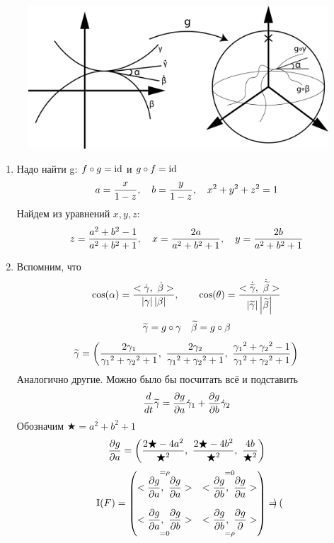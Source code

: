 \documentclass[12pt, fleqn]{article}
\begin{document}
\begin{sol}
  \begin{figure}[H]
      \includegraphics[scale=0.3]{pics/7_1.png}
      \centering
  \end{figure}
  \begin{enumerate}
    \item Надо найти g: $f \circ g = \mathop{\rm id}\nolimits$ и $g \circ f = \mathop{\rm id}\nolimits$
    \[a = \dfrac{x}{1-z},\quad b = \dfrac{y}{1-z},\quad x^2 + y^2 + z^2 = 1\]
    Найдем из уравнений $x,y,z$:
    \[z = \dfrac{a^2 + b^2 - 1}{a^2 + b^2 + 1},\quad
    x = \dfrac{2a}{a^2 + b^2 + 1},\quad
    y=\dfrac{2b}{a^2 + b^2 + 1}\]
    \item Вспомним, что
    \[\cos (\alpha) = \dfrac{<\dot{\gamma},\ \dot{\beta}>}{\abs{\gamma} \abs{\beta}},\qq
    \cos (\theta) = \dfrac{<\dot{\w{\gamma}},\ \dot{\w{\beta}}>}{\abs{\w{\gamma}} \abs{\w{\beta}}}\]
    \[\widetilde{\gamma} = g \circ \gamma\quad \widetilde{\beta} = g \circ \beta\]
    \[\widetilde{\gamma} = \left(
      \dfrac{2 \gamma_1}{{\gamma_1}^2 + {\gamma_2}^2 + 1},\
      \dfrac{2 \gamma_2}{{\gamma_1}^2 + {\gamma_2}^2 + 1},\
      \dfrac{{\gamma_1}^2 + {\gamma_2}^2 - 1}{{\gamma_1}^2 + {\gamma_2}^2 + 1}
    \right)\]
    Аналогично другие. Можно было бы посчитать всё и подставить
    \[\dfrac{d}{dt} \widetilde{\gamma} = \dfrac{\partial g}{\partial a} \dot{\gamma}_1 + \dfrac{\partial g}{\partial b} \dot{\gamma}_2\]
    Обозначим $\bigstar = a^2 + b^2 + 1$
    \[\dfrac{\partial g}{\partial a} = \left(
      \dfrac{2\bigstar-4a^2}{\bigstar^2},\
      \dfrac{2\bigstar-4b^2}{\bigstar^2},\
      \dfrac{4b}{\bigstar^2}
    \right)\]
    \[\RNumb{1}(F) = \begin{pmatrix}
      \os{=\rho}{<\dfrac{\d g}{\d a},\ \dfrac{\d g}{\d a}>} & \os{=0}{<\dfrac{\d g}{\d b},\ \dfrac{\d g}{\d a}>}\\ \\
      \us{=0}{<\dfrac{\d g}{\d a},\ \dfrac{\d g}{\d b}>} & \us{=\rho}{<\dfrac{\d g}{\d b},\ \dfrac{\d g}{\d \mathbf{}}>}
    \end{pmatrix} = \begin{pmatrix}

\end{pmatrix}\]
\end{enumerate}
\end{sol}
\end{document}
